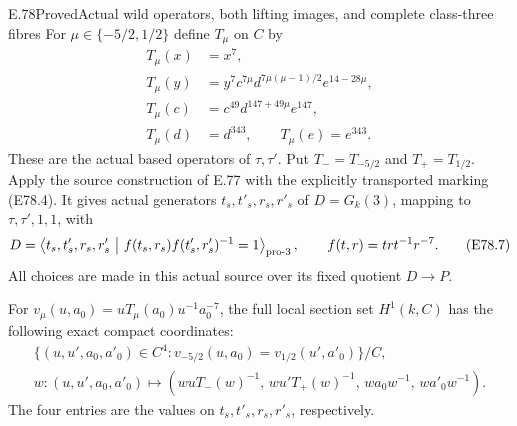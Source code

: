 \begin{statement}{E.78}{Proved}{Actual wild operators, both lifting images, and complete class-three fibres}
For $\mu\in\{-5/2,1/2\}$ define $T_\mu$ on $C$ by
\[
 \begin{aligned}
 T_\mu(x)&=x^7,\\
 T_\mu(y)&=y^7c^{7\mu}
                d^{7\mu(\mu-1)/2}e^{14-28\mu},\\
 T_\mu(c)&=c^{49}d^{147+49\mu}e^{147},\\
 T_\mu(d)&=d^{343},\qquad T_\mu(e)=e^{343}.
 \end{aligned}
 \tag{E78.6}
\]
These are the actual based operators of $\tau,\tau'$.
Put $T_-=T_{-5/2}$ and $T_+=T_{1/2}$.
Apply the source construction of E.77 with the
explicitly transported marking (E78.4). It gives
actual generators $t_s,t'_s,r_s,r'_s$ of
$D=G_k(3)$, mapping to $\tau,\tau',1,1$, with
\[
 D=
 \left\langle t_s,t'_s,r_s,r'_s\ \middle|\
 f(t_s,r_s)f(t'_s,r'_s)^{-1}=1\right\rangle_{\rm pro\text{-}3},
 \qquad f(t,r)=trt^{-1}r^{-7}.
 \tag{E78.7}
\]
All choices are made in this actual source over its
fixed quotient $D\to P$.

For $v_\mu(u,a_0)=uT_\mu(a_0)u^{-1}a_0^{-7}$,
the full local section set $H^1(k,C)$ has the
following exact compact coordinates:
\[
 \begin{gathered}
 \{(u,u',a_0,a'_0)\in C^4:
                v_{-5/2}(u,a_0)=v_{1/2}(u',a'_0)\}/C,\\
 w:(u,u',a_0,a'_0)\longmapsto
 (wuT_-(w)^{-1},\,wu'T_+(w)^{-1},\,
             wa_0w^{-1},\,wa'_0w^{-1}).
 \end{gathered}
 \tag{E78.8}
\]
The four entries are the values on
$t_s,t'_s,r_s,r'_s$, respectively.


\end{statement}
